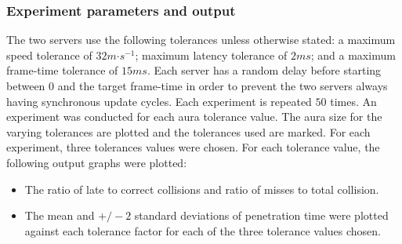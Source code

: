 \subsubsection{Experiment parameters and output}
The two servers use the following tolerances unless otherwise stated: a maximum speed tolerance of $32m\mathord{\cdot}s^{-1}$; maximum latency tolerance of $2ms$; and a maximum frame-time tolerance of $15ms$. Each server has a random delay before starting between $0$ and the target frame-time in order to prevent the two servers always having synchronous update cycles. Each experiment is repeated $50$ times. An experiment was conducted for each aura tolerance value. The aura size for the varying tolerances are plotted and the tolerances used are marked. For each experiment, three tolerances values were chosen. For each tolerance value, the following output graphs were plotted:
\begin{itemize}
	\item The ratio of late to correct collisions and ratio of misses to total collision.
	\item The mean and $+/-2$ standard deviations of penetration time were plotted against each tolerance factor for each of the three tolerance values chosen.
\end{itemize}



